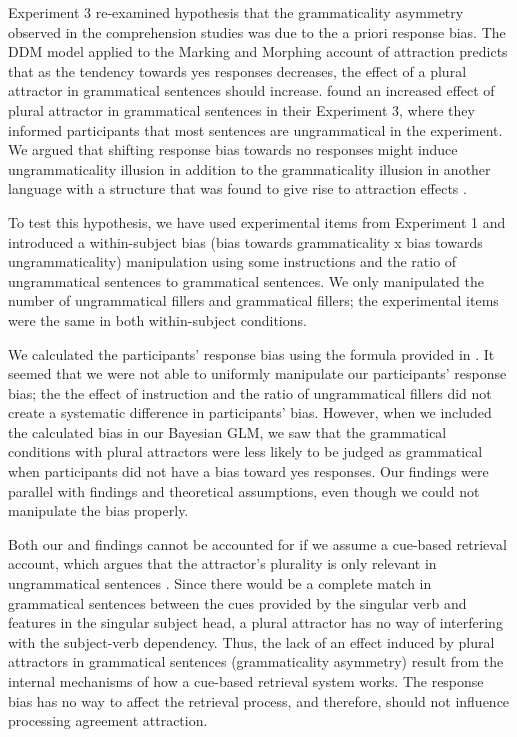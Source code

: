 Experiment 3 re-examined \cites{HammerlyEtAl2019} hypothesis that the grammaticality asymmetry observed in the comprehension studies was due to the a priori response bias. The DDM model applied to the Marking and Morphing account of attraction predicts that as the tendency towards yes responses decreases, the effect of a plural attractor in grammatical sentences should increase.  found an increased effect of plural attractor in grammatical sentences in their Experiment 3, where they informed participants that most sentences are ungrammatical in the experiment. We argued that shifting response bias towards no responses might induce ungrammaticality illusion in addition to the grammaticality illusion in another language with a structure that was found to give rise to attraction effects \citep{LagoEtAl2019}.

To test this hypothesis, we have used experimental items from Experiment 1 and introduced a within-subject bias (bias towards grammaticality x bias towards ungrammaticality) manipulation using some instructions and the ratio of ungrammatical sentences to grammatical sentences. We only manipulated the number of ungrammatical fillers and grammatical fillers; the experimental items were the same in both within-subject conditions.

We calculated the participants' response bias using the formula provided in . It seemed that we were not able to uniformly manipulate our participants' response bias; the the effect of instruction and the ratio of ungrammatical fillers did not create a systematic difference in participants' bias. However, when we included the calculated bias in our Bayesian GLM, we saw that the grammatical conditions with plural attractors were less likely to be judged as grammatical when participants did not have a bias toward yes responses. Our findings were parallel with \cites{HammerlyEtAl2019} findings and theoretical assumptions, even though we could not manipulate the bias properly. 

Both our and \cites{HammerlyEtAl2019} findings cannot be accounted for if we assume a cue-based retrieval account, which argues that the attractor's plurality is only relevant in ungrammatical sentences \citep{LagoEtAl2015, LagoEtAl2019, WagersEtAl:2009}. Since there would be a complete match in grammatical sentences between the cues provided by the singular verb and features in the singular subject head, a plural attractor has no way of interfering with the subject-verb dependency. Thus, the lack of an effect induced by plural attractors in grammatical sentences (grammaticality asymmetry) result from the internal mechanisms of how a cue-based retrieval system works. The response bias has no way to affect the retrieval process, and therefore, should not influence processing agreement attraction. 

